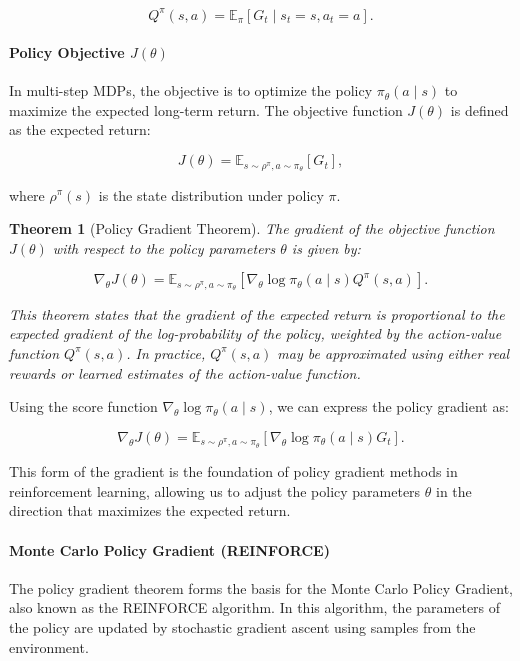\documentclass[10pt, oneside]{article}
\newtheorem{thm}{Theorem}
\theoremstyle{definition}
\begin{document}
\[
Q^\pi(s, a) = \mathbb{E}_\pi [ G_t \mid s_t = s, a_t = a ].
\]

\paragraph{Policy Objective \( J(\theta) \)}

In multi-step MDPs, the objective is to optimize the policy \( \pi_\theta(a \mid s) \) to maximize the expected long-term return. The objective function \( J(\theta) \) is defined as the expected return:

\[
J(\theta) = \mathbb{E}_{s \sim \rho^\pi, a \sim \pi_\theta} [G_t],
\]

where \( \rho^\pi(s) \) is the state distribution under policy \( \pi \).

\begin{thm}[Policy Gradient Theorem]
The gradient of the objective function \( J(\theta) \) with respect to the policy parameters \( \theta \) is given by:

\[
\nabla_\theta J(\theta) = \mathbb{E}_{s \sim \rho^\pi, a \sim \pi_\theta} \left[ \nabla_\theta \log \pi_\theta(a \mid s) Q^\pi(s, a) \right].
\]

This theorem states that the gradient of the expected return is proportional to the expected gradient of the log-probability of the policy, weighted by the action-value function \( Q^\pi(s, a) \). In practice, \( Q^\pi(s, a) \) may be approximated using either real rewards or learned estimates of the action-value function.
\end{thm}

Using the score function \( \nabla_\theta \log \pi_\theta(a \mid s) \), we can express the policy gradient as:

\[
\nabla_\theta J(\theta) = \mathbb{E}_{s \sim \rho^\pi, a \sim \pi_\theta} \left[ \nabla_\theta \log \pi_\theta(a \mid s) G_t \right].
\]

This form of the gradient is the foundation of policy gradient methods in reinforcement learning, allowing us to adjust the policy parameters \( \theta \) in the direction that maximizes the expected return.

\paragraph{Monte Carlo Policy Gradient (REINFORCE)}

The policy gradient theorem forms the basis for the Monte Carlo Policy Gradient, also known as the REINFORCE algorithm. In this algorithm, the parameters of the policy are updated by stochastic gradient ascent using samples from the environment.
\end{document}

